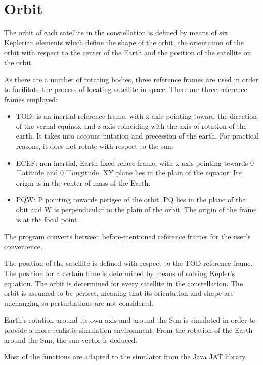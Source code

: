 \section{Orbit}
The orbit of each satellite in the constellation is defined by means of six Keplerian elements which define the shape of the orbit, the orientation of the orbit with respect to the center of the Earth and the position of the satellite on the orbit. 

As there are a number of rotating bodies, three reference frames are used in order to facilitate the process of locating satellite in space. There are three reference frames employed:

\begin{itemize}
\item \acs{TOD}: is an inertial reference frame, with x-axis pointing toward the direction of the vernal equinox and z-axis coinciding with the axis of rotation of the earth. It takes into account nutation and precession of the earth. For practical reasons, it does not rotate with respect to the sun.
 
\item \acs{ECEF}: non inertial, Earth fixed reface frame, with x-axis pointing towards 0 ^\circ latitude and 0 ^\circ longitude. XY plane lies in the plain of the equator. Its origin is in the center of mass of the Earth. 

\item \acs{PQW}: P pointing towards perigee of the orbit, PQ lies in the plane of the obit and W is perpendicular to the plain of the orbit. The origin of the frame is at the focal point. 
\end{itemize}

The program converts between before-mentioned reference frames for the user's convenience.

The position of the satellite is defined with respect to the \acs{TOD} reference frame.  The position for a certain time is determined by means of solving Kepler's equation. The orbit is determined for every satellite in the constellation. The orbit is assumed to be perfect, meaning that its orientation and shape are unchanging so perturbations are not considered. 

Earth's rotation around its own axis and around the Sun is simulated in order to provide a more realistic simulation environment. From the rotation of the Earth around the Sun, the sun vector is deduced. 

Most of the functions are adapted to the simulator from the Java \acs{JAT} library. 

\label{orbit}